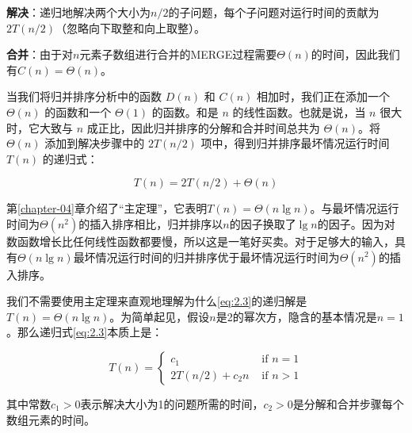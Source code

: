 \documentclass[lang=cn,newtx,10pt,scheme=chinese]{elegantbook}
\begin{document}
\textbf{解决}：递归地解决两个大小为$n/2$的子问题，每个子问题对运行时间的贡献为$2T(n/2)$（忽略向下取整和向上取整）。

\textbf{合并}：由于对$n$元素子数组进行合并的MERGE过程需要$\Theta(n)$的时间，因此我们有$C(n)=\Theta(n)$。

当我们将归并排序分析中的函数 $D(n)$ 和 $C(n)$ 相加时，我们正在添加一个 $\Theta(n)$ 的函数和一个 $\Theta(1)$ 的函数。和是 $n$ 的线性函数。也就是说，当 $n$ 很大时，它大致与 $n$ 成正比，因此归并排序的分解和合并时间总共为 $\Theta(n)$。将 $\Theta(n)$ 添加到解决步骤中的 $2T(n/2)$ 项中，得到归并排序最坏情况运行时间 $T(n)$ 的递归式：

\begin{equation}\label{eq:2.3}
T(n)=2T(n/2)+\Theta(n)
\end{equation}

第\ref{chapter-04}章介绍了``主定理''，它表明$T(n)=\Theta(n\lg{n})$。与最坏情况运行时间为$\Theta(n^2)$的插入排序相比，归并排序以$n$的因子换取了$\lg n$的因子。因为对数函数增长比任何线性函数都要慢，所以这是一笔好买卖。对于足够大的输入，具有$\Theta(n \lg n)$最坏情况运行时间的归并排序优于最坏情况运行时间为$\Theta(n^2)$的插入排序。

我们不需要使用主定理来直观地理解为什么\eqref{eq:2.3}的递归解是$T(n) = \Theta(n \lg n)$。为简单起见，假设$n$是2的幂次方，隐含的基本情况是$n = 1$。那么递归式\eqref{eq:2.3}本质上是：

\begin{equation}\label{eq:2.4}
T(n)= \begin{cases}c_1 & \text { if } n=1 \\ 2 T(n / 2)+c_2 n & \text { if } n>1\end{cases}
\end{equation}

其中常数$c_1 > 0$表示解决大小为1的问题所需的时间，$c_2 > 0$是分解和合并步骤每个数组元素的时间。
\end{document}
